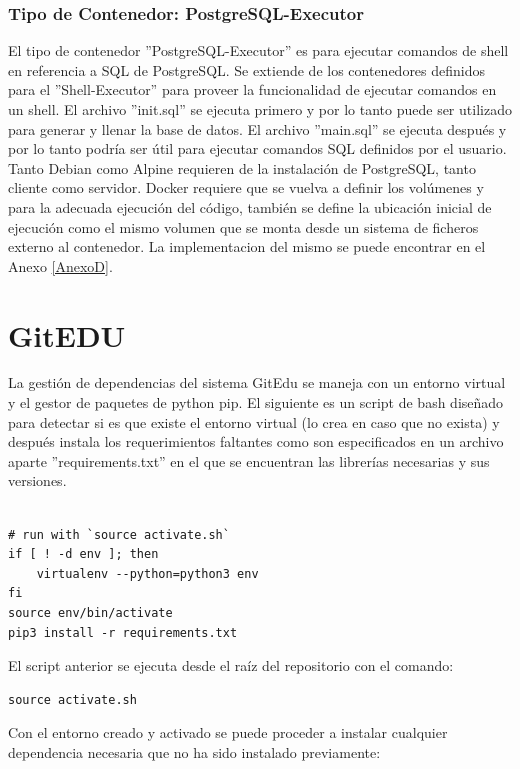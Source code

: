 \subsubsection{Tipo de Contenedor: PostgreSQL-Executor}
El tipo de contenedor ''PostgreSQL-Executor'' es para ejecutar comandos de shell en referencia a SQL de PostgreSQL. Se extiende de los contenedores definidos para el ''Shell-Executor'' para proveer la funcionalidad de ejecutar comandos en un shell. El archivo ''init.sql'' se ejecuta primero y por lo tanto puede ser utilizado para generar y llenar la base de datos. El archivo ''main.sql'' se ejecuta después y por lo tanto podría ser útil para ejecutar comandos SQL definidos por el usuario. Tanto Debian como Alpine requieren de la instalación de PostgreSQL, tanto cliente como servidor. Docker requiere que se vuelva a definir los volúmenes y para la adecuada ejecución del código, también se define la ubicación inicial de ejecución como el mismo volumen que se monta desde un sistema de ficheros externo al contenedor. La implementacion del mismo se puede encontrar en el Anexo \ref{AnexoD}.

\section{GitEDU}

La gestión de dependencias del sistema GitEdu se maneja con un entorno virtual y el gestor de paquetes de python pip. El siguiente es un script de bash diseñado para detectar si es que existe el entorno virtual (lo crea en caso que no exista) y después instala los requerimientos faltantes como son especificados en un archivo aparte ''requirements.txt'' en el que se encuentran las librerías necesarias y sus versiones.

\begin{lstlisting}

# run with `source activate.sh` 
if [ ! -d env ]; then
	virtualenv --python=python3 env
fi
source env/bin/activate
pip3 install -r requirements.txt

\end{lstlisting}

El script anterior se ejecuta desde el raíz del repositorio con el comando:

\begin{lstlisting}
source activate.sh
\end{lstlisting}

Con el entorno creado y activado se puede proceder a instalar cualquier dependencia necesaria que no ha sido instalado previamente:

